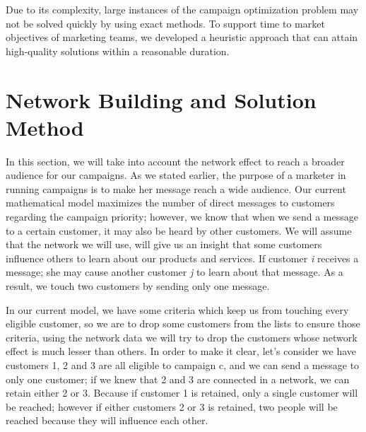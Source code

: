 \documentclass[11pt]{article}
\begin{document}
Due to its complexity, large instances of the campaign optimization problem may not be solved quickly by using exact methods. To support time to market objectives of marketing teams, we developed a heuristic approach that can attain high-quality solutions within a reasonable duration.


\section{Network Building and Solution Method} \label{s:net-building-solution-method}
In this section, we will take into account the network effect to reach a broader audience for our campaigns. As we stated earlier, the purpose of a marketer in running campaigns is to make her message reach a wide audience. Our current mathematical model maximizes the number of direct messages to customers regarding the campaign priority; however, we know that when we send a message to a certain customer, it may also be heard by other customers. We will assume that the network we will use, will give us an insight that some customers influence others to learn about our products and services. If customer \textit{i} receives a message; she may cause another customer \textit{j} to learn about that message. As a result, we touch two customers by sending only one message.

In our current model, we have some criteria which keep us from touching every eligible customer, so we are to drop some customers from the lists to ensure those criteria, using the network data we will try to drop the customers whose network effect is much lesser than others. In order to make it clear, let's consider we have customers 1, 2 and 3 are all eligible to campaign c, and we can send a message to only one customer; if we knew that 2 and 3 are connected in a network, we can retain either 2 or 3. Because if customer 1 is retained, only a single customer will be reached; however if either customers 2 or 3 is retained, two people will be reached because they will influence each other.

\\
\end{document}
